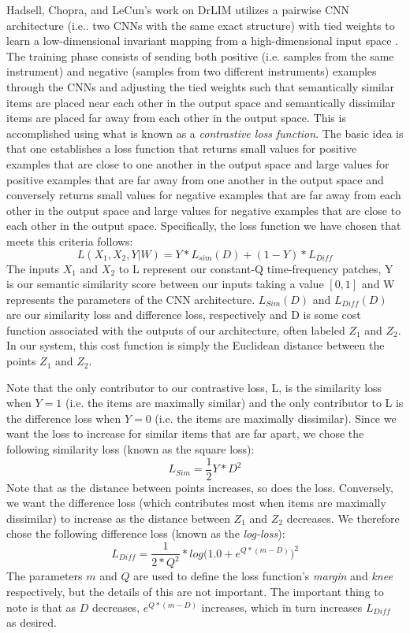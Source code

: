 \documentclass[a4paper,12pt]{report} 	%
\numberwithin{figure}{chapter}
\numberwithin{table}{chapter}
\numberwithin{equation}{chapter}
\begin{document}
\begin{flushleft}
Hadsell, Chopra, and LeCun's work on DrLIM utilizes a pairwise CNN architecture (i.e.. two CNNs with the same exact structure) with tied weights to learn a low-dimensional invariant mapping from a high-dimensional input space \cite{hadsell2006dimensionality}. The training phase consists of sending both positive (i.e. samples from the same instrument) and negative (samples from two different instruments) examples through the CNNs and adjusting the tied weights such that semantically similar items are placed near each other in the output space and semantically dissimilar items are placed far away from each other in the output space. This is accomplished using what is known as a \emph{contrastive loss function}. The basic idea is that one establishes a loss function that returns small values for positive examples that are close to one another in the output space and large values for positive examples that are far away from one another in the output space and conversely returns small values for negative examples that are far away from each other in the output space and large values for negative examples that are close to each other in the output space. Specifically, the loss function we have chosen that meets this criteria follows:
\begin{equation}
L(X_1, X_2, Y|W)=Y*L_{sim}(D)+(1-Y)*L_{Diff}
\end{equation}
The inputs $X_1$ and $X_2$ to L represent our constant-Q time-frequency patches, Y is our semantic similarity score between our inputs taking a value $[0,1]$ and W represents the parameters of the CNN architecture. $L_{Sim}(D)$ and $L_{Diff}(D)$ are our similarity loss and difference loss, respectively and D is some cost function associated with the outputs of our architecture, often labeled $Z_1$ and $Z_2$. In our system, this cost function is simply the Euclidean distance between the points $Z_1$ and $Z_2$.

Note that the only contributor to our contrastive loss, L, is the similarity loss when $Y=1$ (i.e. the items are maximally similar) and the only contributor to L is the difference loss when $Y=0$ (i.e. the items are maximally dissimilar). Since we want the loss to increase for similar items that are far apart, we chose the following similarity loss (known as the square loss):
\begin{equation}
L_{Sim}=\frac{1}{2}Y*D^2
\end{equation}
Note that as the distance between points increases, so does the loss. Conversely, we want the difference loss (which contributes most when items are maximally dissimilar) to increase as the distance between $Z_1$ and $Z_2$ decreases. We therefore chose the following difference loss (known as the \emph{log-loss}):
\begin{equation}
L_{Diff}=\frac{1}{2*Q^2}*log\Big(1.0+e^{Q*(m-D)}\Big)^2
\end{equation}
The parameters $m$ and $Q$ are used to define the loss function's \emph{margin} and \emph{knee} respectively, but the details of this are not important. The important thing to note is that as $D$ decreases, $e^{Q*(m-D)}$ increases, which in turn increases $L_{Diff}$ as desired.


\end{flushleft}
\end{document}

